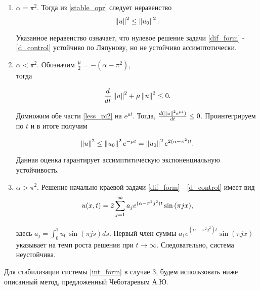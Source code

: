 \begin{enumerate}
    \item $\alpha = \pi^2$. Тогда из \eqref{stable_opr} следует неравенство
        \begin{equation}
            \left\lVert u\right\rVert^2 \le \left\lVert u_0\right\rVert^2.
        \end{equation}

        Указанное неравенство означает, что нулевое решение задачи
        \eqref{dif_form} - \eqref{d_control} устойчиво по Ляпунову, но не 
        устойчиво ассимптотически.

    \item $\alpha < \pi^2$. Обозначим $\frac{\mu}{2} = -(\alpha - \pi^2)$,\\

        тогда

        \begin{equation}\label{less_pi2}
            \frac{d}{dt}\left\lVert u\right\rVert^2 + \mu \left\lVert u\right\rVert^2 \le 0.
        \end{equation}

        Домножим обе части \eqref{less_pi2} на $e^{\mu t}$. Тогда, 
        $\frac{d(\left\lVert u\right\rVert^2 e^{\mu t})}{dt} \le 0$. Проинтегрируем по $t$ и в 
        итоге получим

        \begin{equation*}
            \left\lVert u\right\rVert^2 \le \left\lVert u_0\right\rVert^2 e^{-\mu t} = \left\lVert u_0\right\rVert^2 e^{2(\alpha -
            \pi^2) t}.
        \end{equation*}

        Данная оценка гарантирует ассимптитическую экспоненциальную устойчивость.

    \item $\alpha > \pi^2$. Решение начально краевой задачи 
        \eqref{dif_form} - \eqref{d_control} имеет вид
        \begin{equation}
            u(x, t) = 2 \sum \limits_{j=1}^{\infty}{a_j e^{(\alpha - \pi^2 j^2)t}\sin{(\pi j x)}},
        \end{equation}

        здесь $a_j = \int_0^1{u_0 \sin{(\pi j s)} ds}$. Первый член суммы 
        $a_1e^{(\alpha - \pi^2j^2)t}\sin(\pi j x)$ указывает на темп роста 
        решения при $t \rightarrow \infty$. Следовательно, система неустойчива.
\end{enumerate}

Для стабилизации системы \eqref{int_form} в случае 3, будем использовать ниже 
описанный метод, предложенный Чеботаревым А.Ю.

